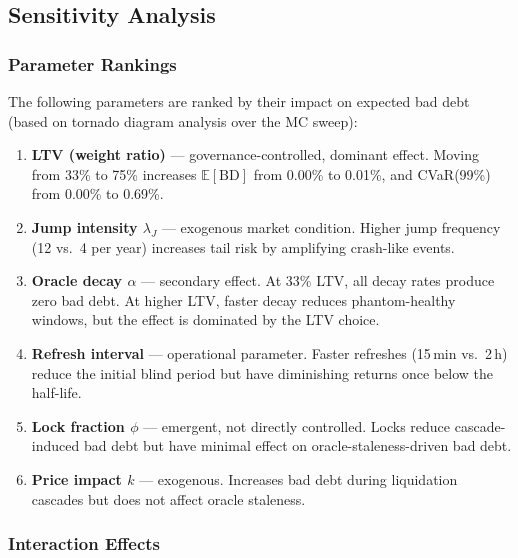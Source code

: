 \documentclass[10pt,a4paper,twocolumn]{article}
\theoremstyle{definition}
\theoremstyle{plain}
\theoremstyle{remark}
\begin{document}
\subsection{Sensitivity Analysis}
\label{sec:bd-sensitivity}

\subsubsection{Parameter Rankings}
\label{subsec:bd-tornado}

The following parameters are ranked by their impact on expected bad debt (based on tornado diagram analysis over the MC sweep):

\begin{enumerate}[leftmargin=*]
\item \textbf{LTV (weight ratio)} --- governance-controlled, dominant effect. Moving from 33\% to 75\% increases $\mathbb{E}[\text{BD}]$ from 0.00\% to 0.01\%, and CVaR(99\%) from 0.00\% to 0.69\%.

\item \textbf{Jump intensity $\lambda_J$} --- exogenous market condition. Higher jump frequency (12 vs.\ 4 per year) increases tail risk by amplifying crash-like events.

\item \textbf{Oracle decay $\alpha$} --- secondary effect. At 33\% LTV, all decay rates produce zero bad debt. At higher LTV, faster decay reduces phantom-healthy windows, but the effect is dominated by the LTV choice.

\item \textbf{Refresh interval} --- operational parameter. Faster refreshes (15\,min vs.\ 2\,h) reduce the initial blind period but have diminishing returns once below the half-life.

\item \textbf{Lock fraction $\phi$} --- emergent, not directly controlled. Locks reduce cascade-induced bad debt but have minimal effect on oracle-staleness-driven bad debt.

\item \textbf{Price impact $k$} --- exogenous. Increases bad debt during liquidation cascades but does not affect oracle staleness.
\end{enumerate}

\subsubsection{Interaction Effects}
\label{subsec:bd-interactions}
\end{document}
